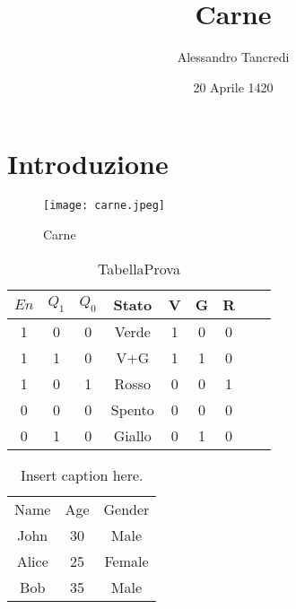 \documentclass{article}
\author{Alessandro Tancredi}
\title{Carne}
\begin{document}
\date{20 Aprile 1420}
\maketitle

\section{Introduzione}

\begin{figure}[H]
    \centering
    \texttt{[image: carne.jpeg]}
    \caption{Carne}
    \label{fig:aaa}
\end{figure}

\begin{table}[!h]
\caption{TabellaProva}
\begin{center}
\label{tab:codifica}
\begin{tabular}{||c|cc|cccc||cc||}
\hline
$En$ & $Q_1$ & $Q_0$ & Stato & V & G & R \\
\hline
1&0     & 0     & Verde & 1 & 0 & 0   \\
1&1     & 0     & V+G   & 1 & 1 & 0    \\
1&0     & 1     & Rosso & 0 & 0 & 1    \\
0 &0     & 0     & Spento & 0 & 0 & 0    \\
0 &1     & 0     & Giallo & 0 & 1 & 0 \\
\hline
\end{tabular}
\end{center}
\end{table}

\begin{table}[htbp]
    \centering
    \begin{tabular}{||c|c|c||}
    \hline
    Name & Age & Gender \\
    John & 30 & Male \\
    Alice & 25 & Female \\
    Bob & 35 & Male \\
    \hline
    \end{tabular}
    \caption{Insert caption here.}
    \label{tab:my_table}
    \end{table}
\end{document}
